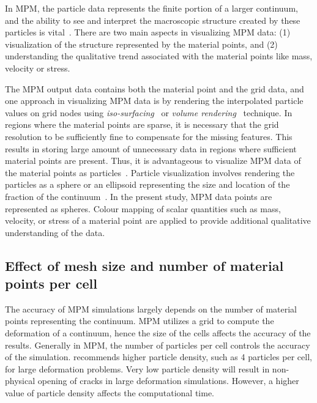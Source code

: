 In MPM, the particle data represents the finite portion of a larger 
continuum, and the ability to see and interpret the 
macroscopic structure created by these particles is vital~\citep{bigler2006}. 
There are two main aspects in visualizing MPM data: (1) visualization of 
the structure represented by the material points, and (2) understanding the 
qualitative trend associated with the material points like mass, velocity or 
stress. 

The MPM output data contains both the material point and the grid data, and
one approach in visualizing MPM data is by rendering the interpolated 
particle values on grid nodes using \textit{iso-surfacing}~\citep{lorensen1987} 
or \textit{volume rendering}~\citep{levoy1988} technique. In regions where the 
material points are sparse, it is necessary that the grid resolution to be 
sufficiently fine to compensate for the missing features. This results in 
storing large amount of unnecessary data in regions where sufficient material 
points are present. Thus, it is advantageous to visualize MPM data of the 
material points as particles~\citep{bigler2006}. Particle visualization 
involves rendering the particles as a sphere or an ellipsoid representing the 
size and location of the fraction of the 
continuum~\citep{kuester2001,krogh1997,gumhold2003}. In the present study, MPM 
data points are represented as spheres.  Colour mapping of scalar 
quantities such as mass, velocity, or stress of a material point are applied to 
provide additional qualitative understanding of the data.



\subsection{Effect of mesh size and number of material points per cell}
\label{sec:MPM_points_per_cell}

The accuracy of MPM simulations largely depends on the number of material 
points representing the continuum. MPM utilizes a grid to compute the 
deformation of a continuum, hence the size of the cells affects the accuracy 
of the results. Generally in MPM, the number of particles per cell controls 
the accuracy of the simulation. \citet{Guilkey2003} recommends higher particle 
density, such as 4 particles per cell, for large deformation problems. Very low 
particle density will result in non-physical opening of cracks in large 
deformation simulations. However, a higher value of particle density affects 
the computational time. 

